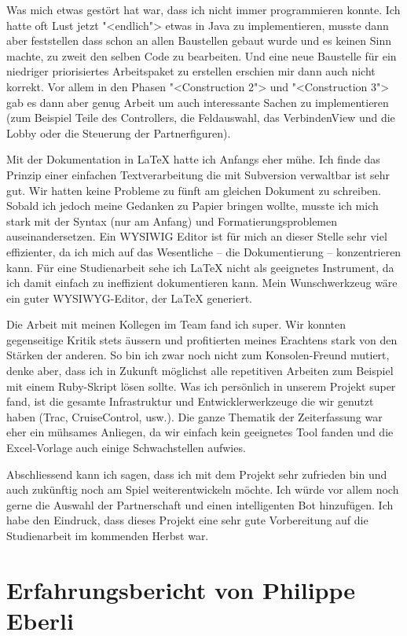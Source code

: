 \documentclass[12pt,halfparskip]{scrartcl}
\begin{document}
Was mich etwas gestört hat war, dass ich nicht immer programmieren konnte. Ich hatte oft Lust jetzt "<endlich"> etwas in Java zu implementieren, musste dann aber feststellen dass schon an allen Baustellen gebaut wurde und es keinen Sinn machte, zu zweit den selben Code zu bearbeiten. Und eine neue Baustelle für ein niedriger priorisiertes Arbeitspaket zu erstellen erschien mir dann auch nicht korrekt. Vor allem in den Phasen "<Construction 2"> und "<Construction 3"> gab es dann aber genug Arbeit um auch interessante Sachen zu implementieren (zum Beispiel Teile des Controllers, die Feldauswahl, das VerbindenView und die Lobby oder die Steuerung der Partnerfiguren).

Mit der Dokumentation in LaTeX hatte ich Anfangs eher mühe. Ich finde das Prinzip einer einfachen Textverarbeitung die mit Subversion verwaltbar ist sehr gut. Wir hatten keine Probleme zu fünft am gleichen Dokument zu schreiben. Sobald ich jedoch meine Gedanken zu Papier bringen wollte, musste ich mich stark mit der Syntax (nur am Anfang) und Formatierungsproblemen auseinandersetzen. Ein WYSIWIG Editor ist für mich an dieser Stelle sehr viel effizienter, da ich mich auf das Wesentliche -- die Dokumentierung -- konzentrieren kann. Für eine Studienarbeit sehe ich LaTeX nicht als geeignetes Instrument, da ich damit einfach zu ineffizient dokumentieren kann. Mein Wunschwerkzeug wäre ein guter WYSIWYG-Editor, der LaTeX generiert.

Die Arbeit mit meinen Kollegen im Team fand ich super. Wir konnten gegenseitige Kritik stets äussern und profitierten meines Erachtens stark von den Stärken der anderen. So bin ich zwar noch nicht zum Konsolen-Freund mutiert, denke aber, dass ich in Zukunft möglichst alle repetitiven Arbeiten zum Beispiel mit einem Ruby-Skript lösen sollte. Was ich persönlich in unserem Projekt super fand, ist die gesamte Infrastruktur und Entwicklerwerkzeuge die wir genutzt haben (Trac, CruiseControl, usw.). Die ganze Thematik der Zeiterfassung war eher ein mühsames Anliegen, da wir einfach kein geeignetes Tool fanden und die Excel-Vorlage auch einige Schwachstellen aufwies.
			
Abschliessend kann ich sagen, dass ich mit dem Projekt sehr zufrieden bin und auch zukünftig noch am Spiel weiterentwickeln möchte. Ich würde vor allem noch gerne die Auswahl der Partnerschaft und einen intelligenten Bot hinzufügen. Ich habe den Eindruck, dass dieses Projekt eine sehr gute Vorbereitung auf die Studienarbeit im kommenden Herbst war.

\section{Erfahrungsbericht von Philippe Eberli}
\end{document}
